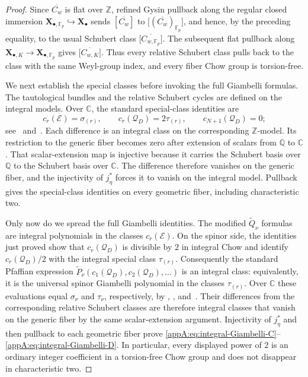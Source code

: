 \documentclass[11pt,a4paper,oneside]{amsart}
\numberwithin{equation}{section}
\theoremstyle{definition}
\theoremstyle{remark}
\begin{document}
\begin{proof}
Since $\overline{C_w}$ is flat over $\mathbb Z$, refined Gysin pullback along
the regular closed immersion
$\mathbf X_{\bullet,\mathbb F_p}\hookrightarrow\mathbf X_\bullet$
sends $[\overline{C_w}]$ to
$\bigl[(\overline{C_w})_{\mathbb F_p}\bigr]$, and hence, by the preceding
equality, to the usual Schubert class
$\bigl[\overline{C_{w,\mathbb F_p}}\bigr]$.  The subsequent flat pullback
along
$\mathbf X_{\bullet,K}\to\mathbf X_{\bullet,\mathbb F_p}$
gives
$\bigl[\overline{C_{w,K}}\bigr]$.  Thus every relative Schubert class pulls
back to the class with the same Weyl-group index, and every fiber Chow group
is torsion-free.

We next establish the special classes before invoking the full Giambelli
formulas.  The tautological bundles and the relative Schubert cycles are
defined on the integral models.  Over $\mathbb C$, the standard special-class
identities are
\[
 c_r(\mathcal E)=\sigma_{(r)},\qquad
 c_r(\mathcal Q_D)=2\tau_{(r)},\qquad
 c_{N+1}(\mathcal Q_D)=0;
\]
see~\cite[Section~2]{KT03} and~\cite[\S3.1]{KT04}.  Each difference is an
integral class on the corresponding $\mathbb Z$-model.  Its restriction to
the generic fiber becomes zero after extension of scalars from $\mathbb Q$
to $\mathbb C$.  That scalar-extension map is injective because it carries
the Schubert basis over $\mathbb Q$ to the Schubert basis over $\mathbb C$.
The difference therefore vanishes on the generic fiber, and the injectivity
of $j_\eta^*$ forces it to vanish on the integral model.  Pullback gives the
special-class identities on every geometric fiber, including characteristic
two.

Only now do we spread the full Giambelli identities.  The modified
$\widetilde Q_\nu$ formulas are integral polynomials in the classes
$c_r(\mathcal E)$.  On the spinor side, the identities just proved show that
$c_r(\mathcal Q_D)$ is divisible by $2$ in integral Chow and identify
$c_r(\mathcal Q_D)/2$ with the integral special class $\tau_{(r)}$.
Consequently the standard Pfaffian expression
$\widetilde P_\nu(c_1(\mathcal Q_D),c_2(\mathcal Q_D),\ldots)$ is an
integral class: equivalently, it is the universal spinor Giambelli polynomial
in the classes $\tau_{(r)}$.  Over $\mathbb C$ these evaluations equal
$\sigma_\nu$ and $\tau_\nu$, respectively, by
\cite[Section~2, equations~(1)--(2)]{KT03},
\cite[\S3.1]{KT04}, and~\cite{PR97}.  Their differences from the corresponding
relative Schubert classes are therefore integral classes that vanish on the
generic fiber by the same scalar-extension argument.  Injectivity of
$j_\eta^*$ and then pullback to each geometric fiber prove
\eqref{appA:eq:integral-Giambelli-C}--
\eqref{appA:eq:integral-Giambelli-D}.  In particular, every displayed power
of $2$ is an ordinary integer coefficient in a torsion-free Chow group and
does not disappear in characteristic two.
\end{proof}
\end{document}
